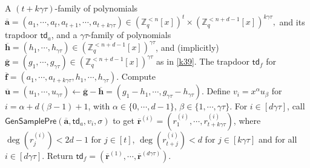 \documentclass[runningheads]{llncs}
\begin{document}
    \begin{algorithm}[h]
    	\caption{$\mathsf{\mathsf{TrapDel}(\overline{\textbf{a}},\overline{\textbf{h}},\mathsf{td},\sigma)}$}
    	\begin{algorithmic}[1]
    		
    		\REQUIRE A $(t+k\gamma \tau)$-family of polynomials $\overline{\mathbf{a}}=(a_1,\cdots,a_t,a_{t+1},\cdots,a_{t+k\gamma \tau}) \in (\mathbb{Z}_q^{<n}[x])^t \times (\mathbb{Z}_q^{<n+d-1}[x])^{k\gamma \tau},$ and its trapdoor $\mathsf{td}_a$, and a $\gamma\tau$-family of polynomials $\overline{\textbf{h}}=(h_1, \cdots, h_{\gamma \tau}) \in  (\mathbb{Z}_q^{<n+d-1}[x])^{\gamma \tau}$, and (implicitly) $\overline{\mathbf{g}}=(g_1,\cdots, g_{\gamma \tau}) \in (\mathbb{Z}_q^{<n+d-1}[x])^{\gamma \tau}$ as in \eqref{k39}.
    		\ENSURE The trapdoor $\mathsf{td}_f$ for $\overline{\textbf{f}}=(a_1,\cdots,a_{t+k\gamma \tau},h_1, \cdots, h_{\gamma \tau})$.
    		\STATE Compute $\overline{\textbf{u}}=(u_1,\cdots, u_{\gamma \tau}) \leftarrow \overline{\textbf{g}}-\overline{\textbf{h}}=(g_1-h_1, \cdots, g_{\gamma \tau}-h_{\gamma \tau})$. %
    		\STATE Define $v_i=x^\alpha u_\beta$ for $i=\alpha+d(\beta-1)+1$, with 
    		   $\alpha \in \{0,\cdots, d-1\}$, $\beta \in \{1,\cdots, \gamma \tau \}$.
    		\STATE   For $i\in [d\gamma\tau]$, call $ \mathsf{GenSamplePre}(\overline{\textbf{a}},\mathsf{td}_a, v_i,\sigma)$ to get $\overline{\mathbf{r}}^{(i)}=(r^{(i)}_{1}, \cdots, r^{(i)}_{t+k\gamma \tau})$,
    		    where $\deg(r^{(i)}_j)<2d-1$ for $j\in[t]$, $\deg(r^{(i)}_{t+j})<d$ for $j \in [k\gamma \tau]$ and for all $i \in [d \gamma \tau]$.
    		    \STATE Return $\mathsf{td}_f=(\overline{\mathbf{r}}^{(1)}, \cdots, \overline{\mathbf{r}}^{(d\gamma\tau)})$.
    	\end{algorithmic}
    	\label{algo1}
    \end{algorithm}
    
     
  
    
\end{document}
